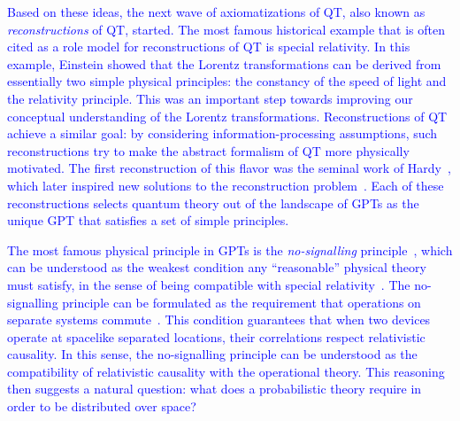 \documentclass[prl,aps,reprint,twocolumn,10pt,superscriptaddress,floatfix]{revtex4-2}
\begin{document}
\textcolor{blue}{Based on these ideas, the next wave of axiomatizations of QT,
also known as \emph{reconstructions} of QT, started. The most famous
historical example that is often cited as a role model for reconstructions of
QT is special relativity. In this example, Einstein showed that the Lorentz transformations
can be derived from essentially two simple physical principles: the constancy
of the speed of light and the relativity principle. This was an important
step towards improving our conceptual understanding of the Lorentz
transformations. Reconstructions of QT achieve a similar goal: by considering
information-processing assumptions, such reconstructions try to make the
abstract formalism of QT more physically motivated. The first reconstruction
of this flavor was the seminal work of Hardy~\cite{Hardy2001}, which later
inspired new solutions to the reconstruction
problem~\cite{CDP2011, MasanesMuller2011}. Each of these reconstructions
selects quantum theory out of the landscape of GPTs as the unique GPT that
satisfies a set of simple principles.}

\textcolor{blue}{The most famous physical principle in GPTs is the
\emph{no-signalling} principle~\cite{PopescuRohrlich1994}, which can be
understood as the weakest condition any ``reasonable'' physical theory must
satisfy, in the sense of being compatible with special
relativity~\cite{Gisin2020}. The no-signalling principle can be formulated as
the requirement that operations on separate systems
commute~\cite{Barrett2007}. This condition guarantees that when two devices
operate at spacelike separated locations, their correlations respect
relativistic causality. In this sense, the no-signalling principle can be
understood as the compatibility of relativistic causality with the operational
theory. This reasoning then suggests a natural question: what does a
probabilistic theory require in order to be distributed over space?}
\end{document}
